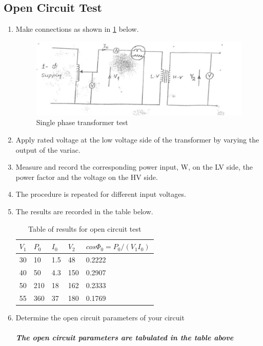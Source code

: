 \documentclass[12pt,a4paper]{report}
\begin{document}
\subsection{Open Circuit Test}
\begin{enumerate}
    \item Make connections as shown in \ref{fig_3} below.
    \begin{figure}[H]
        \centering
        \includegraphics[width=0.8\linewidth]{figure_3_3.jpeg}
        \caption{Single phase transformer test}
        \label{fig_3}
    \end{figure}
    \item Apply rated voltage at the low voltage side of the transformer by varying the output of the variac.
    \item Measure and record the corresponding power input, W, on the LV side, the power factor and the voltage on the HV side.
    \item The procedure is repeated for different input voltages.
    \item The results are recorded in the table below.


\begin{table}[H]
    \centering
    \caption{Table of results for open circuit test}
    \begin{tabular}{|l|l|l|l|l|}
    \hline
    $V_{1}$ & $P_{0}$  & $I_{0}$  & $V_{2}$  & $cos\Phi_{0}=P_{0}/(V_{1}I_{0})$ \\ \hline
    30 & 10  & 1.5 & 48  & 0.2222          \\ \hline
    40 & 50  & 4.3 & 150 & 0.2907          \\ \hline
    50 & 210 & 18  & 162 & 0.2333          \\ \hline
    55 & 360 & 37  & 180 & 0.1769          \\ \hline
    \end{tabular}
    \end{table}
    \item Determine the open circuit parameters of your circuit\\
    \\
    \textbf{\textit{The open circuit parameters are tabulated in the table above}}
\end{enumerate}
\end{document}
